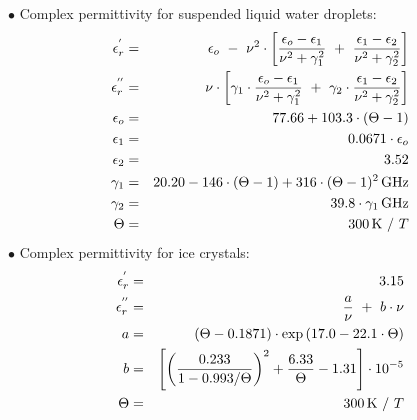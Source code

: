 \noindent$\bullet$ Complex permittivity for suspended liquid water droplets:
\begin{eqnarray}
  \label{eq:abs_theory:comp_perm_lwc}
  \ree       & = & \epsilon_o~-~\nu^2\cdot
                   \left[\frac{\epsilon_o-\epsilon_1}{\nu^2+\gamma_1^2}~+~
                   \frac{\epsilon_1-\epsilon_2}{\nu^2+\gamma_2^2}\right]\nonumber\\
%
  \ime       & = & \nu\cdot\left[\gamma_1\cdot
                   \frac{\epsilon_o-\epsilon_1}{\nu^2+\gamma_1^2}~+~
                   \gamma_2\cdot\frac{\epsilon_1-\epsilon_2}{\nu^2+\gamma_2^2}\right]\nonumber\\
%
  \label{eq:abs_theory:comp_perm_lwc_epsilon_0}
  \epsilon_o & = & 77.66 + 103.3\cdot(\Theta-1)\\
  \epsilon_1 & = & 0.0671\cdot\epsilon_o\nonumber\\
  \epsilon_2 & = & 3.52\nonumber\\
%
  \label{eq:abs_theory:comp_perm_lwc_gamma_1}
  \gamma_1   & = & 20.20 - 146\cdot(\Theta-1) + 316\cdot(\Theta-1)^2\,\mbox{GHz}\\
  \gamma_2   & = & 39.8\cdot\gamma_1\,\mbox{GHz}\nonumber\\
%
  \Theta     & = & 300\,\mbox{K}~/~T\nonumber
%
\end{eqnarray}
$\bullet$ Complex permittivity for ice crystals:
\begin{eqnarray}
  \label{eq:abs_theory:comp_perm_iwc}
  \ree    & = & 3.15\nonumber\\
%
  \ime    & = & \frac{a}{\nu}~+~b\cdot\nu\nonumber\\
%
  \label{eq:abs_theory:comp_perm_iwc_a}
  a       & = & (\Theta-0.1871)\cdot\exp{(17.0-22.1\cdot\Theta)}\\
  \label{eq:abs_theory:comp_perm_iwc_b}
  b       & = & \left[\left(\frac{0.233}{1-0.993/\Theta}\right)^2 + 
                \frac{6.33}{\Theta} - 1.31\right]\cdot10^{-5}\\
%
  \Theta  & = & 300\,\mbox{K}~/~T\nonumber
%
\end{eqnarray}
